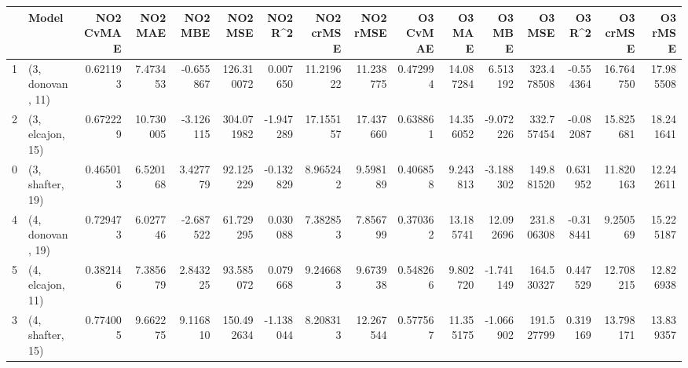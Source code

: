 \begin{tabular}{llrrrrrrrrrrrrrr}
\toprule
{} &             Model &  NO2 CvMAE &    NO2 MAE &   NO2 MBE &     NO2 MSE &   NO2 R\textasciicircum2 &  NO2 crMSE &   NO2 rMSE &  O3 CvMAE &     O3 MAE &     O3 MBE &      O3 MSE &    O3 R\textasciicircum2 &   O3 crMSE &    O3 rMSE \\
\midrule
1 &  (3, donovan, 11) &   0.621193 &   7.473453 & -0.655867 &  126.310072 &  0.007650 &  11.219622 &  11.238775 &  0.472994 &  14.087284 &   6.513192 &  323.478508 & -0.554364 &  16.764750 &  17.985508 \\
2 &  (3, elcajon, 15) &   0.672229 &  10.730005 & -3.126115 &  304.071982 & -1.947289 &  17.155157 &  17.437660 &  0.638861 &  14.356052 &  -9.072226 &  332.757454 & -0.082087 &  15.825681 &  18.241641 \\
0 &  (3, shafter, 19) &   0.465013 &   6.520168 &  3.427779 &   92.125229 & -0.132829 &   8.965242 &   9.598189 &  0.406858 &   9.243813 &  -3.188302 &  149.881520 &  0.631952 &  11.820163 &  12.242611 \\
4 &  (4, donovan, 19) &   0.729473 &   6.027746 & -2.687522 &   61.729295 &  0.030088 &   7.382853 &   7.856799 &  0.370362 &  13.185741 &  12.092696 &  231.806308 & -0.318441 &   9.250569 &  15.225187 \\
5 &  (4, elcajon, 11) &   0.382146 &   7.385679 &  2.843225 &   93.585072 &  0.079668 &   9.246683 &   9.673938 &  0.548266 &   9.802720 &  -1.741149 &  164.530327 &  0.447529 &  12.708215 &  12.826938 \\
3 &  (4, shafter, 15) &   0.774005 &   9.662275 &  9.116810 &  150.492634 & -1.138044 &   8.208313 &  12.267544 &  0.577567 &  11.355175 &  -1.066902 &  191.527799 &  0.319169 &  13.798171 &  13.839357 \\
\bottomrule
\end{tabular}
